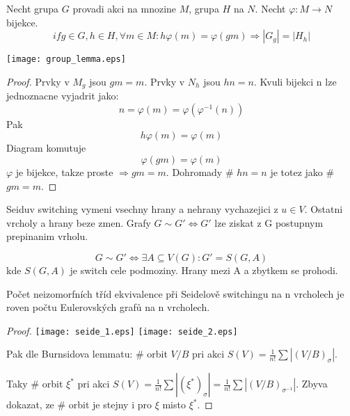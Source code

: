 \begin{theorem}
\end{theorem}

\begin{lemma}
Necht grupa $G$ provadi akci na mnozine $M$, grupa $H$ na $N$. Necht $\varphi:M \to N$ bijekce.
	\[ if g \in G, h \in H, \forall m \in M: h\varphi(m) = \varphi(gm) \Rightarrow |G_{g}| = |H_{h}| \]

	\texttt{[image: group\_lemma.eps]}
\end{lemma}
\begin{proof}
Prvky v $M_g$ jsou $gm = m$. Prvky v $N_h$ jsou $hn = n$. Kvuli bijekci n lze jednoznacne vyjadrit jako:
\[ n = \varphi(m) = \varphi(\varphi^{-1}(n)) \]
Pak
\[ h\varphi(m) = \varphi(m) \]
Diagram komutuje
\[ \varphi(gm) = \varphi(m) \]
$\varphi$ je bijekce, takze proste $\Rightarrow gm = m$. Dohromady \# $hn = n$ je totez jako \# $gm = m$.
\end{proof}

\begin{definition}
Seiduv switching vymeni vsechny hrany a nehrany vychazejici z $u \in V$. Ostatni vrcholy a hrany beze zmen. Grafy $G \sim G' \iff G'$ lze ziskat z G postupnym prepinanim vrholu.
\end{definition}

\begin{note}
	\[ G \sim G' \iff \exists A \subseteq V(G): G' = S(G,A) \]
	kde $S(G,A)$ je switch cele podmoziny. Hrany mezi A a zbytkem se prohodi.
\end{note}

\begin{theorem}
Počet neizomorfních tříd ekvivalence při Seidelově switchingu na n vrcholech je roven počtu Eulerovských grafů na n vrcholech.
\end{theorem}
\begin{proof}

	\texttt{[image: seide\_1.eps]}
	\texttt{[image: seide\_2.eps]}

	Pak dle Burnsidova lemmatu: \# orbit $V/B$ pri akci $S(V) = \frac{1}{n!} \sum |(V/B)_{\sigma}|$.

	Taky \# orbit $\xi^{\ast}$ pri akci $S(V) = \frac{1}{n!} \sum |(\xi^{\ast})_{\sigma}| = \frac{1}{n!} \sum |(V/B)_{\sigma^{-1}}|$.
	Zbyva dokazat, ze \# orbit je stejny i pro $\xi$ misto $\xi^{\ast}$.

\end{proof}
